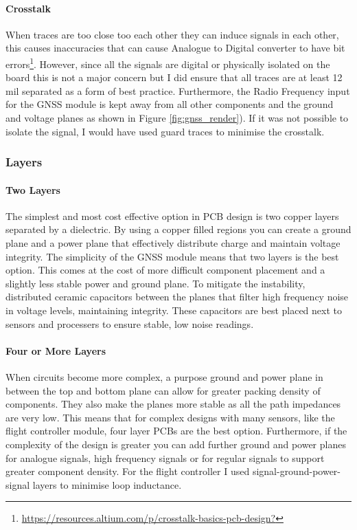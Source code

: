 \paragraph{Crosstalk}
When traces are too close too each other they can induce signals in each other, this causes inaccuracies that can cause Analogue to Digital converter to have bit errors\footnote{\url{https://resources.altium.com/p/crosstalk-basics-pcb-design?}}. However, since all the signals are digital or physically isolated on the board this is not a major concern but I did ensure that all traces are at least 12 mil separated as a form of best practice. Furthermore, the Radio Frequency input for the \gls{GNSS} module is kept away from all other components and the ground and voltage planes as shown in Figure \ref{fig:gnss_render}). If it was not possible to isolate the signal, I would have used guard traces to minimise the crosstalk.

\subsubsection{Layers}\label{sub_sub_section:tgt_layers}
\paragraph{Two Layers}
The simplest and most cost effective option in \gls{PCB} design is two copper layers separated by a dielectric. By using a copper filled regions you can create a ground plane and a power plane that effectively distribute charge and maintain voltage integrity. The simplicity of the \gls{GNSS} module means that two layers is the best option. This comes at the cost of more difficult component placement and a slightly less stable power and ground plane. To mitigate the instability, distributed ceramic capacitors between the planes that filter high frequency noise in voltage levels, maintaining integrity. These capacitors are best placed next to sensors and processers to ensure stable, low noise readings.
\paragraph{Four or More Layers}
When circuits become more complex, a purpose ground and power plane in between the top and bottom plane can allow for greater packing density of components. They also make the planes more stable as all the path impedances are very low. This means that for complex designs with many sensors, like the flight controller module, four layer \gls{PCB}s are the best option. Furthermore, if the complexity of the design is greater you can add further ground and power planes for analogue signals, high frequency signals or for regular signals to support greater component density. For the flight controller I used signal-ground-power-signal layers to minimise loop inductance.


